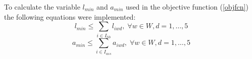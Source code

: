 To calculate the variable $l_{min}$ and $a_{min}$ used in the objective function (\ref{objfcn}) the following equations were implemented:
\begin{equation} \label{constr:l_min}
l_{min} \leq \sum_{i \in I_{lib}} l_{iwd}, \; \forall w \in W, d=1, \ldots, 5
\end{equation}
\begin{equation} \label{constr:a_min}
a_{min} \leq \sum_{i \in I_{ass}} a_{iwd}, \; \forall w \in W, d=1, \ldots, 5
\end{equation}


%
